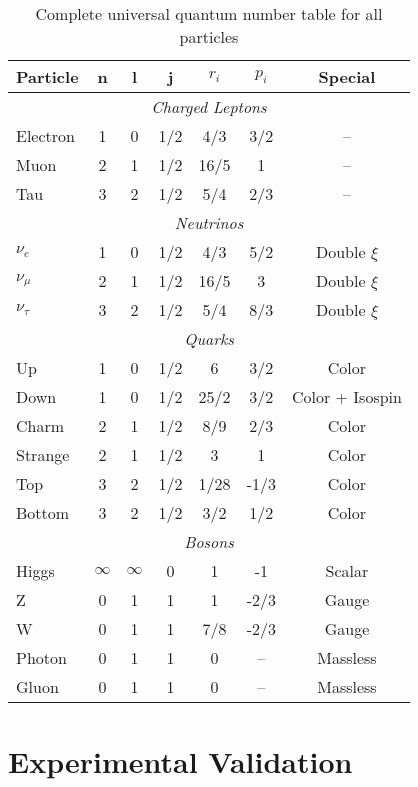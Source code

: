 \documentclass[12pt,a4paper]{article}
\begin{document}
	\begin{table}[H]
		\centering
		\begin{tabular}{lcccccc}
			\toprule
			\textbf{Particle} & \textbf{n} & \textbf{l} & \textbf{j} & \textbf{$r_i$} & \textbf{$p_i$} & \textbf{Special} \\
			\midrule
			\multicolumn{7}{c}{\textit{Charged Leptons}} \\
			\midrule
			Electron & 1 & 0 & 1/2 & 4/3 & 3/2 & -- \\
			Muon & 2 & 1 & 1/2 & 16/5 & 1 & -- \\
			Tau & 3 & 2 & 1/2 & 5/4 & 2/3 & -- \\
			\midrule
			\multicolumn{7}{c}{\textit{Neutrinos}} \\
			\midrule
			$\nu_e$ & 1 & 0 & 1/2 & 4/3 & 5/2 & Double $\xi$ \\
			$\nu_\mu$ & 2 & 1 & 1/2 & 16/5 & 3 & Double $\xi$ \\
			$\nu_\tau$ & 3 & 2 & 1/2 & 5/4 & 8/3 & Double $\xi$ \\
			\midrule
			\multicolumn{7}{c}{\textit{Quarks}} \\
			\midrule
			Up & 1 & 0 & 1/2 & 6 & 3/2 & Color \\
			Down & 1 & 0 & 1/2 & 25/2 & 3/2 & Color + Isospin \\
			Charm & 2 & 1 & 1/2 & 8/9 & 2/3 & Color \\
			Strange & 2 & 1 & 1/2 & 3 & 1 & Color \\
			Top & 3 & 2 & 1/2 & 1/28 & -1/3 & Color \\
			Bottom & 3 & 2 & 1/2 & 3/2 & 1/2 & Color \\
			\midrule
			\multicolumn{7}{c}{\textit{Bosons}} \\
			\midrule
			Higgs & $\infty$ & $\infty$ & 0 & 1 & -1 & Scalar \\
			Z & 0 & 1 & 1 & 1 & -2/3 & Gauge \\
			W & 0 & 1 & 1 & 7/8 & -2/3 & Gauge \\
			Photon & 0 & 1 & 1 & 0 & -- & Massless \\
			Gluon & 0 & 1 & 1 & 0 & -- & Massless \\
			\bottomrule
		\end{tabular}
		\caption{Complete universal quantum number table for all particles}
		\label{tab:universal_quantum_numbers}
	\end{table}
	
	\section{Experimental Validation}
	\label{sec:experimental_validation}
	
\end{document}
